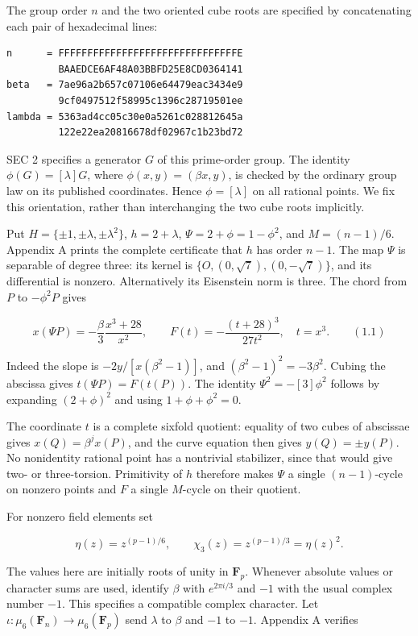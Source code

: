 \documentclass[
  11pt,
  a4paper,
]{article}
\begin{document}
The group order \(n\) and the two oriented cube roots are specified by
concatenating each pair of hexadecimal lines:

\begin{verbatim}
n      = FFFFFFFFFFFFFFFFFFFFFFFFFFFFFFFE
         BAAEDCE6AF48A03BBFD25E8CD0364141
beta   = 7ae96a2b657c07106e64479eac3434e9
         9cf0497512f58995c1396c28719501ee
lambda = 5363ad4cc05c30e0a5261c028812645a
         122e22ea20816678df02967c1b23bd72
\end{verbatim}

SEC 2 specifies a generator \(G\) of this prime-order group. The
identity \(\phi(G)=[\lambda]G\), where \(\phi(x,y)=(\beta x,y)\), is
checked by the ordinary group law on its published coordinates. Hence
\(\phi=[\lambda]\) on all rational points. We fix this orientation,
rather than interchanging the two cube roots implicitly.

Put \(H=\{\pm1,\pm\lambda,\pm\lambda^2\}\), \(h=2+\lambda\),
\(\Psi=2+\phi=1-\phi^2\), and \(M=(n-1)/6\). Appendix A prints the
complete certificate that \(h\) has order \(n-1\). The map \(\Psi\) is
separable of degree three: its kernel is
\(\{O,(0,\sqrt7),(0,-\sqrt7)\}\), and its differential is nonzero.
Alternatively its Eisenstein norm is three. The chord from \(P\) to
\(-\phi^2P\) gives

\[
x(\Psi P)=-\frac{\beta}{3}\frac{x^3+28}{x^2},\qquad
F(t)=-\frac{(t+28)^3}{27t^2},\quad t=x^3. \qquad (1.1)
\]

Indeed the slope is \(-2y/[x(\beta^2-1)]\), and
\((\beta^2-1)^2=-3\beta^2\). Cubing the abscissa gives
\(t(\Psi P)=F(t(P))\). The identity \(\Psi^2=-[3]\phi^2\) follows by
expanding \((2+\phi)^2\) and using \(1+\phi+\phi^2=0\).

The coordinate \(t\) is a complete sixfold quotient: equality of two
cubes of abscissae gives \(x(Q)=\beta^j x(P)\), and the curve equation
then gives \(y(Q)=\pm y(P)\). No nonidentity rational point has a
nontrivial stabilizer, since that would give two- or three-torsion.
Primitivity of \(h\) therefore makes \(\Psi\) a single \((n-1)\)-cycle
on nonzero points and \(F\) a single \(M\)-cycle on their quotient.

For nonzero field elements set

\[
\eta(z)=z^{(p-1)/6},\qquad \chi_3(z)=z^{(p-1)/3}=\eta(z)^2.
\]

The values here are initially roots of unity in \(\mathbf F_p\).
Whenever absolute values or character sums are used, identify \(\beta\)
with \(e^{2\pi i/3}\) and \(-1\) with the usual complex number \(-1\).
This specifies a compatible complex character. Let
\(\iota:\mu_6(\mathbf F_n)\to\mu_6(\mathbf F_p)\) send \(\lambda\) to
\(\beta\) and \(-1\) to \(-1\). Appendix A verifies
\end{document}
